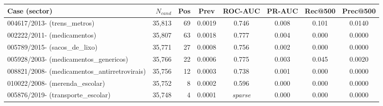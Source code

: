 \begin{tabular}{lrrccccc}
\toprule
Case (sector) & $N_{cand}$ & Pos & Prev & ROC-AUC & PR-AUC & Rec@500 & Prec@500 \\
\midrule
004617/2013- (trens\_metros) & 35,813 & 69 & 0.0019 & 0.746 & 0.008 & 0.101 & 0.0140 \\
002222/2011- (medicamentos) & 35,807 & 63 & 0.0018 & 0.777 & 0.004 & 0.000 & 0.0000 \\
005789/2015- (sacos\_de\_lixo) & 35,771 & 27 & 0.0008 & 0.756 & 0.002 & 0.000 & 0.0000 \\
005928/2003- (medicamentos\_genericos) & 35,766 & 22 & 0.0006 & 0.775 & 0.003 & 0.045 & 0.0020 \\
008821/2008- (medicamentos\_antirretrovirais) & 35,756 & 12 & 0.0003 & 0.738 & 0.001 & 0.000 & 0.0000 \\
010022/2008- (merenda\_escolar) & 35,752 & 8 & 0.0002 & 0.596 & 0.000 & 0.000 & 0.0000 \\
005876/2019- (transporte\_escolar) & 35,748 & 4 & 0.0001 & \emph{sparse} & 0.000 & 0.000 & 0.0000 \\
\bottomrule
\end{tabular}
